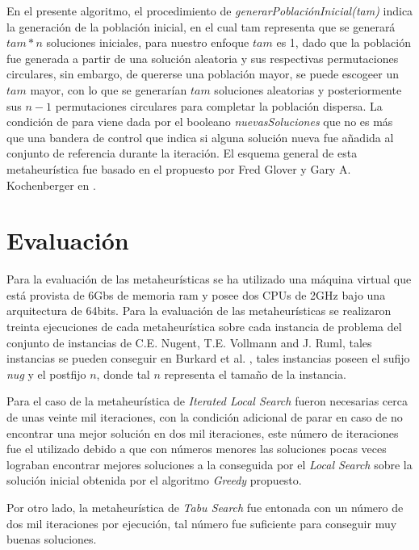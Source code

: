 \documentclass{ci5652}
\begin{document}
En el presente algoritmo, el procedimiento de \textit{generarPoblaciónInicial(tam)} indica la generación de la población inicial, en el cual tam representa que se generará \(tam*n\) soluciones iniciales, para nuestro enfoque \(tam\) es 1, dado que la población fue generada a partir de una solución aleatoria y sus respectivas permutaciones circulares, sin embargo, de quererse una población mayor, se puede escogeer un \(tam\) mayor, con lo que se generarían \(tam\) soluciones aleatorias y posteriormente sus \(n - 1\) permutaciones circulares para completar la población dispersa. La condición de para viene dada por el booleano \textit{nuevasSoluciones} que no es más que una bandera de control que indica si alguna solución nueva fue añadida al conjunto de referencia durante la iteración. El esquema general de esta metaheurística fue basado en el propuesto por Fred Glover y Gary A. Kochenberger en \cite{glover}.

\section{Evaluación}

Para la evaluación de las metaheurísticas se ha utilizado una máquina virtual que está provista de 6Gbs de memoria ram y posee dos CPUs de 2GHz bajo una arquitectura de 64bits. Para la evaluación de las metaheurísticas se realizaron treinta ejecuciones de cada metaheurística sobre cada instancia de problema del conjunto de instancias de C.E. Nugent, T.E. Vollmann and J. Ruml, tales instancias se pueden conseguir en Burkard et al. \cite{burkard2012}, tales instancias poseen el sufijo \textit{nug} y el postfijo \(n\), donde tal \(n\) representa el tamaño de la instancia.

Para el caso de la metaheurística de \textit{Iterated Local Search} fueron necesarias cerca de unas veinte mil iteraciones, con la condición adicional de parar en caso de no encontrar una mejor solución en dos mil iteraciones, este número de iteraciones fue el utilizado debido a que con números menores las soluciones pocas veces lograban encontrar mejores soluciones a la conseguida por el \textit{Local Search} sobre la solución inicial obtenida por el algoritmo \textit{Greedy} propuesto.

Por otro lado, la metaheurística de \textit{Tabu Search} fue entonada con un número de dos mil iteraciones por ejecución, tal número fue suficiente para conseguir muy buenas soluciones.
\end{document}
